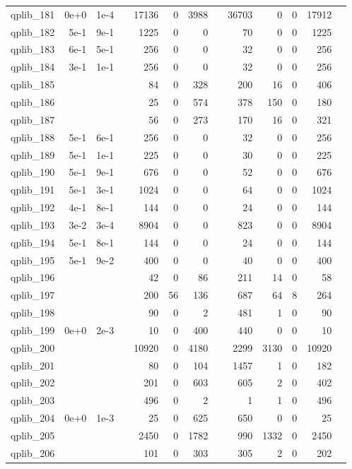 \begin{table}
\begin{tabular}{lrrrrrrrrrrrr}
qplib\_181	&	0e+0	&	1e-4	&	&	17136	&	0	&	3988	&	&	36703	&	0	&	0	&	17912	\\
qplib\_182	&	5e-1	&	9e-1	&	&	1225	&	0	&	0	&	&	70	&	0	&	0	&	1225	\\
qplib\_183	&	6e-1	&	5e-1	&	&	256	&	0	&	0	&	&	32	&	0	&	0	&	256	\\
qplib\_184	&	3e-1	&	1e-1	&	&	256	&	0	&	0	&	&	32	&	0	&	0	&	256	\\
qplib\_185	&		&		&	&	84	&	0	&	328	&	&	200	&	16	&	0	&	406	\\
qplib\_186	&		&		&	&	25	&	0	&	574	&	&	378	&	150	&	0	&	180	\\
qplib\_187	&		&		&	&	56	&	0	&	273	&	&	170	&	16	&	0	&	321	\\
qplib\_188	&	5e-1	&	6e-1	&	&	256	&	0	&	0	&	&	32	&	0	&	0	&	256	\\
qplib\_189	&	5e-1	&	1e-1	&	&	225	&	0	&	0	&	&	30	&	0	&	0	&	225	\\
qplib\_190	&	5e-1	&	9e-1	&	&	676	&	0	&	0	&	&	52	&	0	&	0	&	676	\\
qplib\_191	&	5e-1	&	3e-1	&	&	1024	&	0	&	0	&	&	64	&	0	&	0	&	1024	\\
qplib\_192	&	4e-1	&	8e-1	&	&	144	&	0	&	0	&	&	24	&	0	&	0	&	144	\\
qplib\_193	&	3e-2	&	3e-4	&	&	8904	&	0	&	0	&	&	823	&	0	&	0	&	8904	\\
qplib\_194	&	5e-1	&	8e-1	&	&	144	&	0	&	0	&	&	24	&	0	&	0	&	144	\\
qplib\_195	&	5e-1	&	9e-2	&	&	400	&	0	&	0	&	&	40	&	0	&	0	&	400	\\
qplib\_196	&		&		&	&	42	&	0	&	86	&	&	211	&	14	&	0	&	58	\\
qplib\_197	&		&		&	&	200	&	56	&	136	&	&	687	&	64	&	8	&	264	\\
qplib\_198	&		&		&	&	90	&	0	&	2	&	&	481	&	1	&	0	&	90	\\
qplib\_199	&	0e+0	&	2e-3	&	&	10	&	0	&	400	&	&	440	&	0	&	0	&	10	\\
qplib\_200	&		&		&	&	10920	&	0	&	4180	&	&	2299	&	3130	&	0	&	10920	\\
qplib\_201	&		&		&	&	80	&	0	&	104	&	&	1457	&	1	&	0	&	182	\\
qplib\_202	&		&		&	&	201	&	0	&	603	&	&	605	&	2	&	0	&	402	\\
qplib\_203	&		&		&	&	496	&	0	&	2	&	&	1	&	1	&	0	&	496	\\
qplib\_204	&	0e+0	&	1e-3	&	&	25	&	0	&	625	&	&	650	&	0	&	0	&	25	\\
qplib\_205	&		&		&	&	2450	&	0	&	1782	&	&	990	&	1332	&	0	&	2450	\\
qplib\_206	&		&		&	&	101	&	0	&	303	&	&	305	&	2	&	0	&	202	\\

\end{tabular}
\end{table}
